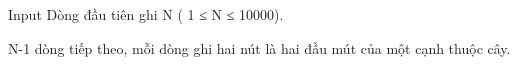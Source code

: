 Input
Dòng đầu tiên ghi N ( 1 ≤ N ≤ 10000).


N-1 dòng tiếp theo, mỗi dòng ghi hai nút là hai đầu mút của một cạnh thuộc cây.